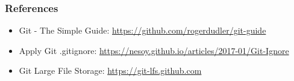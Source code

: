 \documentclass[aspectratio=169]{beamer}
\begin{document}
	\begin{frame}
		\frametitle{References}
		
		\begin{itemize}
			\item Git - The Simple Guide: \url{https://github.com/rogerdudler/git-guide}
			\item Apply Git .gitignore: \url{https://nesoy.github.io/articles/2017-01/Git-Ignore}
			\item Git Large File Storage: \url{https://git-lfs.github.com}
		\end{itemize}
	\end{frame}
\end{document}
